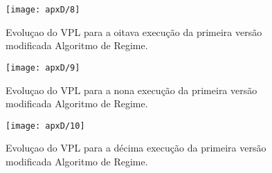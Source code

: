 \begin{figure}[H]
\centering
\texttt{[image: apxD/8]}
\caption{Evoluçao do VPL para a oitava execução da primeira versão modificada  Algoritmo de Regime.}
\label{fig:graphRPM-08}
\end{figure}

\begin{figure}[H]
\centering
\texttt{[image: apxD/9]}
\caption{Evoluçao do VPL para a nona execução da primeira versão modificada Algoritmo de Regime.}
\label{fig:graphRPM-09}
\end{figure}

\begin{figure}[H]
\centering
\texttt{[image: apxD/10]}
\caption{Evoluçao do VPL para a décima execução da primeira versão modificada Algoritmo de Regime.}
\label{fig:graphRPM-10}
\end{figure}